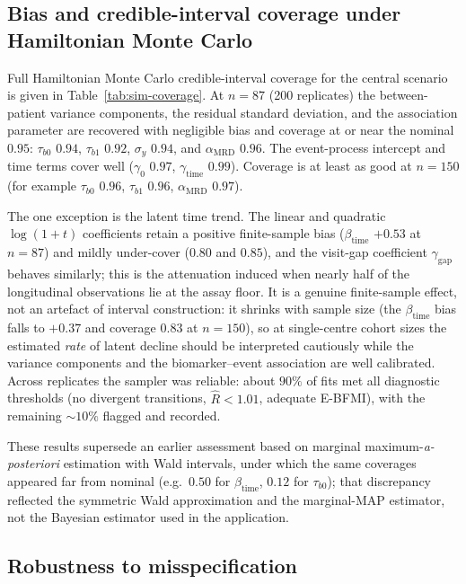 \documentclass[11pt]{article}
\begin{document}
\subsection{Bias and credible-interval coverage under Hamiltonian Monte Carlo}
\label{sec:sim:coverage}

Full Hamiltonian Monte Carlo credible-interval coverage for the central
scenario is given in Table~\ref{tab:sim-coverage}. At $n=87$ (200 replicates)
the between-patient variance components, the residual standard deviation, and
the association parameter are recovered with negligible bias and coverage at or
near the nominal $0.95$: $\tau_{b0}$ $0.94$, $\tau_{b1}$ $0.92$, $\sigma_y$
$0.94$, and $\alpha_{\mathrm{MRD}}$ $0.96$. The event-process intercept and time
terms cover well ($\gamma_0$ $0.97$, $\gamma_{\mathrm{time}}$ $0.99$). Coverage
is at least as good at $n=150$ (for example $\tau_{b0}$ $0.96$, $\tau_{b1}$
$0.96$, $\alpha_{\mathrm{MRD}}$ $0.97$).

The one exception is the latent time trend. The linear and quadratic
$\log(1+t)$ coefficients retain a positive finite-sample bias
($\beta_{\mathrm{time}}$ $+0.53$ at $n=87$) and mildly under-cover ($0.80$ and
$0.85$), and the visit-gap coefficient $\gamma_{\mathrm{gap}}$ behaves
similarly; this is the attenuation induced when nearly half of the longitudinal
observations lie at the assay floor. It is a genuine finite-sample effect, not
an artefact of interval construction: it shrinks with sample size (the
$\beta_{\mathrm{time}}$ bias falls to $+0.37$ and coverage $0.83$ at
$n=150$), so at single-centre cohort sizes the estimated \emph{rate} of latent
decline should be interpreted cautiously while the variance components and the
biomarker--event association are well calibrated. Across replicates the sampler
was reliable: about $90\%$ of fits met all diagnostic thresholds (no divergent
transitions, $\widehat R<1.01$, adequate E-BFMI), with the remaining $\sim10\%$
flagged and recorded.

These results supersede an earlier assessment based on marginal
maximum-\emph{a-posteriori} estimation with Wald intervals, under which the same
coverages appeared far from nominal (e.g.\ $0.50$ for $\beta_{\mathrm{time}}$,
$0.12$ for $\tau_{b0}$); that discrepancy reflected the symmetric Wald
approximation and the marginal-MAP estimator, not the Bayesian estimator used in
the application.



\subsection{Robustness to misspecification}
\label{sec:sim:misspec}
\end{document}
